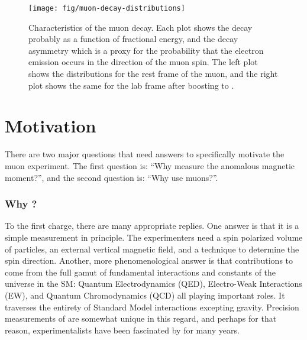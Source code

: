\begin{figure}
\label{fig:muon-decay-distributions}
\centering
\texttt{[image: fig/muon-decay-distributions]}
\caption{Characteristics of the muon decay.  Each plot shows the decay probably as a function of fractional energy, and the decay asymmetry which is a proxy for the probability that the electron emission occurs in the direction of the muon spin.  The left plot shows the distributions for the rest frame of the muon, and the right plot shows the same for the lab frame after boosting to \pmagic.}
\end{figure}

\section{Motivation}
There are two major questions that need answers to specifically motivate the muon \gmtwo experiment.  The first question is: ``Why measure the anomalous magnetic moment?'', and the second question is: ``Why use muons?''.

\subsubsection{Why \gmtwo?}
To the first charge, there are many appropriate replies.  One answer is that it is a simple measurement in principle.  The experimenters need a spin polarized volume of particles, an external vertical magnetic field, and a technique to determine the spin direction. Another, more phenomenological answer is that contributions to \gmtwo come from the full gamut of fundamental interactions and constants of the universe in the SM: Quantum Electrodynamics (QED), Electro-Weak Interactions (EW), and Quantum Chromodynamics (QCD) all playing important roles. It traverses the entirety of Standard Model interactions excepting gravity. Precision measurements of \gmtwo are somewhat unique in this regard, and perhaps for that reason, experimentalists have been fascinated by \gmtwo for many years.

